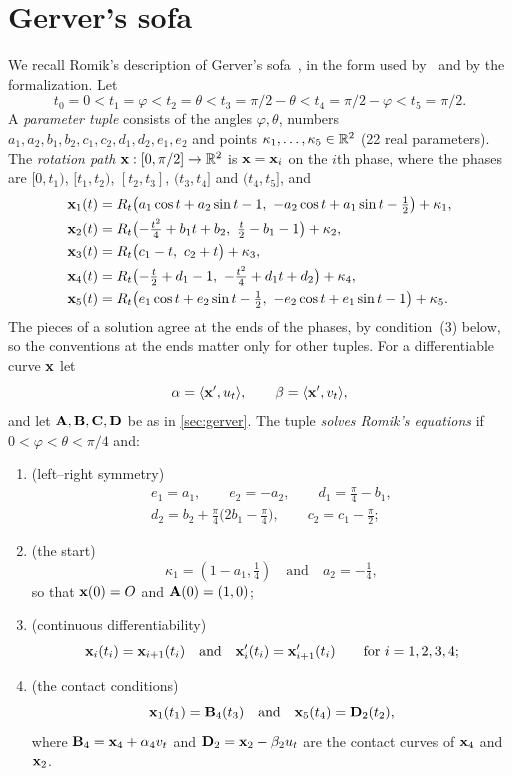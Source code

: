 \section{Gerver's sofa}\label{app:gerver}

We recall Romik's description of Gerver's sofa~\cite[Section~4]{Romik18}, in the
form used by~\cite{Baek} and by the formalization. Let
\[
  t_0=0<t_1=\varphi<t_2=\theta<t_3=\pi/2-\theta<t_4=\pi/2-\varphi<t_5=\pi/2.
\]
A \emph{parameter tuple} consists of the angles $\varphi,\theta$, numbers
$a_1,a_2,b_1,b_2,\allowbreak c_1,c_2,\allowbreak d_1,d_2,\allowbreak e_1,e_2$
and points $\kappa_1,\dots,\kappa_5\in\mathbb{R}^2$ (22 real parameters). The
\emph{rotation path} $\mathbf{x}:[0,\pi/2]\to\mathbb{R}^2$ is $\mathbf{x}=\mathbf{x}_i$ on the $i$th phase,
where the phases are $[0,t_1)$, $[t_1,t_2)$, $[t_2,t_3]$, $(t_3,t_4]$ and
$(t_4,t_5]$, and
\begin{align*}
  \xx_1(t)&=R_t\bigl(a_1\cos t+a_2\sin t-1,\ -a_2\cos t+a_1\sin t-\tfrac12\bigr)
    +\kappa_1,\\
  \xx_2(t)&=R_t\bigl(-\tfrac{t^2}4+b_1t+b_2,\ \tfrac t2-b_1-1\bigr)+\kappa_2,\\
  \xx_3(t)&=R_t\bigl(c_1-t,\ c_2+t\bigr)+\kappa_3,\\
  \xx_4(t)&=R_t\bigl(-\tfrac t2+d_1-1,\ -\tfrac{t^2}4+d_1t+d_2\bigr)+\kappa_4,\\
  \xx_5(t)&=R_t\bigl(e_1\cos t+e_2\sin t-\tfrac12,\ -e_2\cos t+e_1\sin t-1\bigr)
    +\kappa_5 .
\end{align*}
The pieces of a solution agree at the ends of the phases, by condition~(3)
below, so the conventions at the ends matter only for other tuples. For a
differentiable curve $\mathbf{x}$ let
\[
  \alpha=\langle \mathbf{x}',u_t\rangle,\qquad\beta=\langle \mathbf{x}',v_t\rangle,
\]
and let $\mathbf{A},\mathbf{B},\mathbf{C},\mathbf{D}$ be as in \cref{sec:gerver}. The tuple \emph{solves
Romik's equations} if $0<\varphi<\theta<\pi/4$ and:
\begin{enumerate}[label=(\arabic*)]
\item (left--right symmetry)
\begin{gather*}
  e_1=a_1,\qquad e_2=-a_2,\qquad d_1=\tfrac\pi4-b_1,\\
  d_2=b_2+\tfrac\pi4\bigl(2b_1-\tfrac\pi4\bigr),\qquad c_2=c_1-\tfrac\pi2;
\end{gather*}
\item (the start)
\[
  \kappa_1=(1-a_1,\tfrac14)\quad\text{and}\quad a_2=-\tfrac14,
\]
so that $\mathbf{x}(0)=O$ and $\mathbf{A}(0)=(1,0)$;
\item (continuous differentiability)
\[
  \mathbf{x}_i(t_i)=\mathbf{x}_{i+1}(t_i)\quad\text{and}\quad\mathbf{x}_i'(t_i)=\mathbf{x}_{i+1}'(t_i)
  \qquad\text{for }i=1,2,3,4;
\]
\item (the contact conditions)
\[
  \mathbf{x}_1(t_1)=\mathbf{B}_4(t_3)\quad\text{and}\quad\mathbf{x}_5(t_4)=\mathbf{D}_2(t_2),
\]
where $\mathbf{B}_4=\mathbf{x}_4+\alpha_4v_t$ and $\mathbf{D}_2=\mathbf{x}_2-\beta_2u_t$ are the contact
curves of $\mathbf{x}_4$ and $\mathbf{x}_2$.
\end{enumerate}
